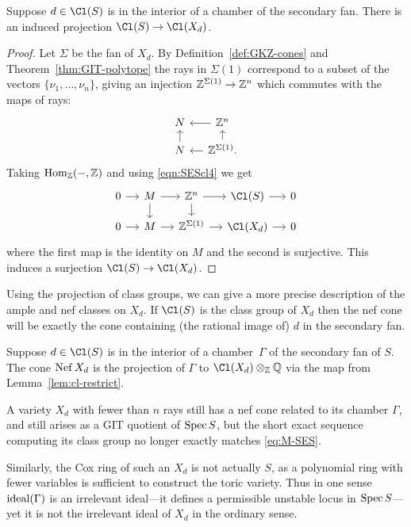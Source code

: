 \documentclass{article}
\begin{document}
\begin{lemma}\label{lem:cl-restrict}
  Suppose $d\in\Cl(S)$ is in the interior of a chamber of the secondary fan.  There is an induced projection $\Cl(S)\to\Cl(X_d)$.
\end{lemma}

\begin{proof}
  Let $\Sigma$ be the fan of $X_d$.  By Definition~\ref{def:GKZ-cones} and Theorem~\ref{thm:GIT-polytope} the rays in $\Sigma(1)$ correspond to a subset of the vectors $\{\nu_1,\ldots,\nu_n\}$, giving an injection $\mathbb Z^{\Sigma(1)}\to\mathbb Z^n$ which commutes with the maps of rays:
  \[\begin{tikzcd}[column sep=small, row sep=small]
    N & \ZZ^n\arrow[l]\\
    N\arrow[u] & \ZZ^{\Sigma(1)}.\arrow[l]\arrow[u]
  \end{tikzcd}\]
  Taking $\operatorname{Hom}_\mathbb Z(-,\mathbb Z)$ and using \eqref{eqn:SEScl4} we get
  \[\begin{tikzcd}[column sep=small, row sep=small]
    0\arrow[r] & M\arrow[r]\arrow[d] & \ZZ^n\arrow[r]\arrow[d] & \Cl(S)\arrow[r] & 0\\
    0\arrow[r] & M\arrow[r] & \ZZ^{\Sigma(1)}\arrow[r] & \Cl(X_d)\arrow[r] & 0
  \end{tikzcd}\]
  where the first map is the identity on $M$ and the second is surjective.  This induces a surjection $\Cl(S)\to\Cl(X_d)$.
\end{proof}

Using the projection of class groups, we can give a more precise description of the ample and nef classes on $X_d$.  If $\Cl(S)$ is the class group of $X_d$ then the nef cone will be exactly the cone containing (the rational image of) $d$ in the secondary fan.

\begin{thm}\label{thm:nef-chamber}
  Suppose $d\in\Cl(S)$ is in the interior of a chamber~$\Gamma$ of the secondary fan of $S$.  The cone $\operatorname{Nef} X_d$ is the projection of $\Gamma$ to $\Cl(X_d)\otimes_\ZZ\QQ$ via the map from Lemma~\ref{lem:cl-restrict}.
\end{thm}

A variety $X_d$ with fewer than $n$ rays still has a nef cone related to its chamber $\Gamma$, and still arises as a GIT quotient of $\operatorname{Spec} S$, but the short exact sequence computing its class group no longer exactly matches \eqref{eq:M-SES}.

Similarly, the Cox ring of such an $X_d$ is not actually $S$, as a polynomial ring with fewer variables is sufficient to construct the toric variety.  Thus in one sense $\operatorname{ideal}(\Gamma)$ is an irrelevant ideal---it defines a permissible unstable locus in $\operatorname{Spec} S$---yet it is not the irrelevant ideal of $X_d$ in the ordinary sense.
\end{document}
